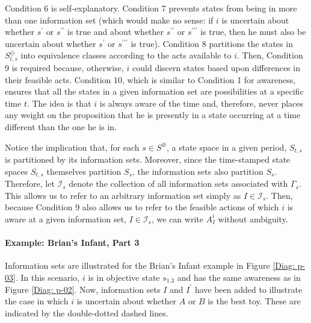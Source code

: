 \documentclass[
11pt,
titlepage,
reqno,
]{article}%
\theoremstyle{definition}
\begin{document}
Condition 6 is self-explanatory. 
Condition 7 prevents states from being in more than one information set (which would make no sense: if $i$ is uncertain about whether $s^{\prime}$ or $s^{\prime\prime}$ is true and about whether $s^{\prime\prime}$ or $s^{\prime\prime\prime}$ is true, then he must also be uncertain about whether $s^{\prime}$ or $s^{\prime\prime\prime}$ is true).
Condition 8  partitions the states in $S^\ominus_{t,s}$ into equivalence classes according to the acts available to $i$.
Then, Condition 9 is required because, otherwise, $i$ could discern states based upon differences in their feasible acts.
Condition 10, which is similar to Condition 1 for awareness, ensures that all the states in a given information set are possibilities at a specific time $t$.
The idea is that $i$ is always aware of the time and, therefore, never places any weight on the proposition that he is presently in a state occurring at a time different than the one he is in. 


Notice the implication that, for each $s\in S^\oplus$, a state space in a given period, $S_{t,s}$ is partitioned by its information sets.
Moreover, since the time-stamped state spaces $S_{t,s}$ themselves partition $S_s$, the information sets also partition $S_s$.
Therefore, let $\mathcal{I}_s$ denote the collection of all information sets associated with $\Gamma_s$.
This allows us to refer to an arbitrary information set simply as $I\in\mathcal{I}_s$.
Then, because Condition 9 also allows us to refer to the feasible actions of which $i$ is aware at a given information set, $I\in\mathcal{I}_s$, we can write $A^i_I$ without ambiguity.
	
\paragraph{Example: Brian's Infant, Part 3}	Information sets are illustrated for the Brian's Infant example in Figure \ref{Diag: p-03}. 
In this scenario, $i$ is in objective state $s_{1.3}$ and has the same awareness as in Figure \ref{Diag: p-02}. 
Now, information sets $I$ and $I^\prime$ have been added to illustrate the case in which $i$ is uncertain about whether $A$ or $B$ is the best toy.
These are indicated by the double-dotted dashed lines. 
	
\end{document}
